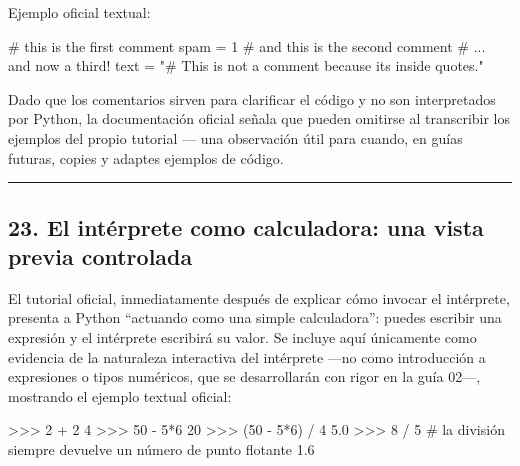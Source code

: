 \documentclass[
  doc,
  floatsintext,
  longtable,
  a4paper,
  nolmodern,
  notxfonts,
  notimes,
  12pt,
  colorlinks=true,linkcolor=blue,citecolor=blue,urlcolor=blue]{apa7}
\newenvironment{Shaded}{\begin{snugshade}}{\end{snugshade}}
\newcommand{\CommentTok}[1]{\textcolor[rgb]{0.37,0.37,0.37}{#1}}
\newcommand{\DecValTok}[1]{\textcolor[rgb]{0.68,0.00,0.00}{#1}}
\newcommand{\FloatTok}[1]{\textcolor[rgb]{0.68,0.00,0.00}{#1}}
\newcommand{\NormalTok}[1]{\textcolor[rgb]{0.00,0.23,0.31}{#1}}
\newcommand{\OperatorTok}[1]{\textcolor[rgb]{0.37,0.37,0.37}{#1}}
\newcommand{\StringTok}[1]{\textcolor[rgb]{0.13,0.47,0.30}{#1}}
\begin{document}
Ejemplo oficial textual:

\begin{Shaded}
\begin{Highlighting}[]
\CommentTok{\# this is the first comment}
\NormalTok{spam }\OperatorTok{=} \DecValTok{1}  \CommentTok{\# and this is the second comment}
          \CommentTok{\# ... and now a third!}
\NormalTok{text }\OperatorTok{=} \StringTok{"\# This is not a comment because it\textquotesingle{}s inside quotes."}
\end{Highlighting}
\end{Shaded}

Dado que los comentarios sirven para clarificar el código y no son
interpretados por Python, la documentación oficial señala que pueden
omitirse al transcribir los ejemplos del propio tutorial --- una
observación útil para cuando, en guías futuras, copies y adaptes
ejemplos de código.

\begin{center}\rule{0.5\linewidth}{0.5pt}\end{center}

\subsection{23. El intérprete como calculadora: una vista previa
controlada}\label{el-intuxe9rprete-como-calculadora-una-vista-previa-controlada}

El tutorial oficial, inmediatamente después de explicar cómo invocar el
intérprete, presenta a Python ``actuando como una simple calculadora'':
puedes escribir una expresión y el intérprete escribirá su valor. Se
incluye aquí únicamente como evidencia de la naturaleza interactiva del
intérprete ---no como introducción a expresiones o tipos numéricos, que
se desarrollarán con rigor en la guía 02---, mostrando el ejemplo
textual oficial:

\begin{Shaded}
\begin{Highlighting}[]
\OperatorTok{\textgreater{}\textgreater{}\textgreater{}} \DecValTok{2} \OperatorTok{+} \DecValTok{2}
\DecValTok{4}
\OperatorTok{\textgreater{}\textgreater{}\textgreater{}} \DecValTok{50} \OperatorTok{{-}} \DecValTok{5}\OperatorTok{*}\DecValTok{6}
\DecValTok{20}
\OperatorTok{\textgreater{}\textgreater{}\textgreater{}}\NormalTok{ (}\DecValTok{50} \OperatorTok{{-}} \DecValTok{5}\OperatorTok{*}\DecValTok{6}\NormalTok{) }\OperatorTok{/} \DecValTok{4}
\FloatTok{5.0}
\OperatorTok{\textgreater{}\textgreater{}\textgreater{}} \DecValTok{8} \OperatorTok{/} \DecValTok{5}  \CommentTok{\# la división siempre devuelve un número de punto flotante}
\FloatTok{1.6}
\end{Highlighting}
\end{Shaded}
\end{document}
